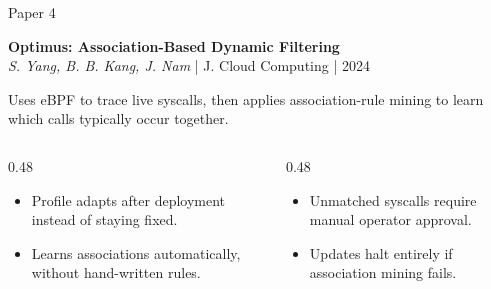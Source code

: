 \documentclass[aspectratio=169,11pt]{beamer}
\begin{document}
\begin{frame}{Paper 4}
\vspace{0.4cm}
\begin{center}
{\Large\bfseries Optimus: Association-Based Dynamic Filtering}\\[0.15cm]
{\small\color{DarkGray}\textit{S. Yang, B. B. Kang, J. Nam} | J. Cloud Computing | 2024}
\end{center}

\vspace{0.2cm}
{\small Uses eBPF to trace live syscalls, then applies association-rule mining to learn which calls typically occur together.}

\vspace{0.2cm}
\begin{columns}[T,onlytextwidth]
\begin{column}{0.48\textwidth}
\begin{tcolorbox}[colback=green!5,colframe=green!50!black,title={\textcolor{green!50!black}{\faCheckCircle}~Where It Wins},fonttitle=\bfseries\small,boxrule=0.5pt,arc=2mm,left=2mm,right=2mm,top=1mm,bottom=1mm]
\footnotesize
\begin{itemize}
  \item Profile adapts after deployment instead of staying fixed.
  \item Learns associations automatically, without hand-written rules.
\end{itemize}
\end{tcolorbox}
\end{column}

\begin{column}{0.48\textwidth}
\begin{tcolorbox}[colback=red!5,colframe=red!50!black,title={\textcolor{red}{\faTimesCircle}~Where It Struggles},fonttitle=\bfseries\small,boxrule=0.5pt,arc=2mm,left=2mm,right=2mm,top=1mm,bottom=1mm]
\footnotesize
\begin{itemize}
  \item Unmatched syscalls require manual operator approval.
  \item Updates halt entirely if association mining fails.
\end{itemize}
\end{tcolorbox}
\end{column}
\end{columns}
\end{frame}
\end{document}
